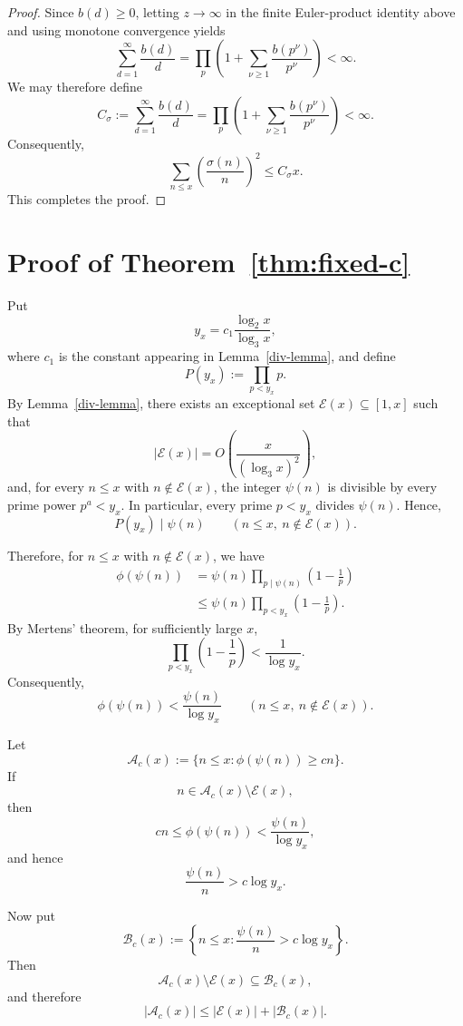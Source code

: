 \documentclass{article}
\theoremstyle{remark}
\begin{document}
\begin{proof}
Since \(b(d)\geq0\), letting \(z\to\infty\) in the finite Euler-product
identity above and using monotone convergence yields
\[
\sum_{d=1}^{\infty}\frac{b(d)}{d}
=
\prod_p
\left(
1+\sum_{\nu\geq1}\frac{b(p^\nu)}{p^\nu}
\right)
<\infty.
\]
We may therefore define
\[
C_\sigma
:=
\sum_{d=1}^{\infty}\frac{b(d)}{d}
=
\prod_p
\left(
1+\sum_{\nu\geq1}\frac{b(p^\nu)}{p^\nu}
\right)
<\infty.
\]
Consequently,
\[
\sum_{n\leq x}
\left(\frac{\sigma(n)}{n}\right)^2
\leq C_\sigma x.
\]
This completes the proof.
\end{proof}





\medskip

\section{Proof of Theorem~\ref{thm:fixed-c} }
Put
\[
        y_x=c_1\frac{\log_2 x}{\log_3 x},
\]
where \(c_1\) is the constant appearing in Lemma~\ref{div-lemma}, and define
\[
        P(y_x):=\prod_{p<y_x}p .
\]
By Lemma~\ref{div-lemma}, there exists an exceptional set
\(\mathcal E(x)\subseteq [1,x]\) such that
\[
        |\mathcal E(x)|
        =O\left(\frac{x}{(\log_3 x)^2}\right),
\]
and, for every \(n\le x\) with \(n\notin\mathcal E(x)\), the integer
\(\psi(n)\) is divisible by every prime power \(p^a<y_x\). In particular,
every prime \(p<y_x\) divides \(\psi(n)\). Hence,
\[
        P(y_x)\mid \psi(n)
        \qquad (n\le x,\ n\notin\mathcal E(x)).
\]

Therefore, for \(n\le x\) with \(n\notin\mathcal E(x)\), we have
\[
\begin{aligned}
 \phi(\psi(n))
 &=\psi(n)\prod_{p\mid \psi(n)}
        \left(1-\frac1p\right)\\
 &\leq \psi(n)\prod_{p<y_x}
        \left(1-\frac1p\right).
\end{aligned}
\]
By Mertens' theorem, for sufficiently large \(x\),
\[
        \prod_{p<y_x}\left(1-\frac1p\right)
        <\frac1{\log y_x}.
\]
Consequently,
\[
        \phi(\psi(n))
        <\frac{\psi(n)}{\log y_x}
        \qquad (n\le x,\ n\notin\mathcal E(x)).
\]

Let
\[
        \mathcal A_c(x):=
        \{n\le x:\phi(\psi(n))\ge cn\}.
\]
If
\[
        n\in\mathcal A_c(x)\setminus\mathcal E(x),
\]
then
\[
        cn\leq \phi(\psi(n))
        <\frac{\psi(n)}{\log y_x},
\]
and hence
\[
        \frac{\psi(n)}n>c\log y_x .
\]

Now put
\[
        \mathcal B_c(x):=
        \left\{
        n\le x:\frac{\psi(n)}n>c\log y_x
        \right\}.
\]
Then
\[
        \mathcal A_c(x)\setminus\mathcal E(x)
        \subseteq \mathcal B_c(x),
\]
and therefore
\[
        |\mathcal A_c(x)|
        \leq |\mathcal E(x)|+|\mathcal B_c(x)|.
\]
\end{document}
